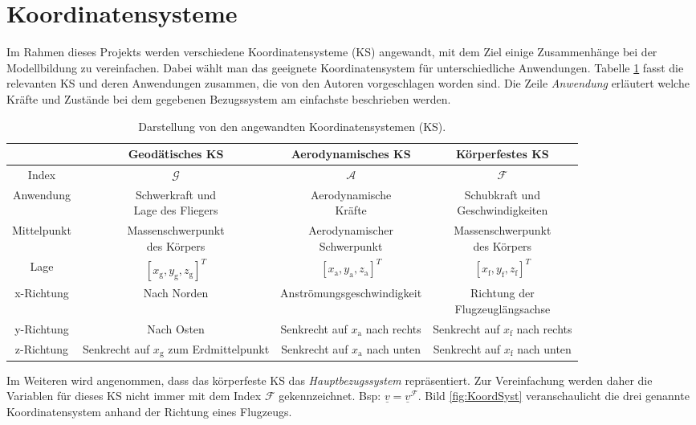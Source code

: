 \section{Koordinatensysteme}
Im Rahmen dieses Projekts werden verschiedene Koordinatensysteme (KS) angewandt, mit dem Ziel einige Zusammenhänge bei der Modellbildung zu vereinfachen. Dabei wählt man das geeignete Koordinatensystem für unterschiedliche Anwendungen. Tabelle \ref{tab:KoordSystem} fasst die relevanten KS und deren Anwendungen zusammen, die von den Autoren \cite{FlugmechanikBuch} vorgeschlagen worden sind. Die Zeile \textit{Anwendung} erläutert welche Kräfte und Zustände bei dem gegebenen Bezugssystem am einfachste beschrieben werden.
\begin{table}[h]
 \begin{tabular}{||c c c c ||} 
 \hline
 &Geodätisches KS  & Aerodynamisches KS & Körperfestes KS\\ [0.5ex] 
\hline
Index&$\mathcal{G}$  & $\mathcal{A}$ & $\mathcal{F}$\\
\hline
Anwendung&  \makecell{Schwerkraft und \\Lage des Fliegers} &  \makecell{Aerodynamische\\ Kräfte} &  \makecell{Schubkraft und \\Geschwindigkeiten} \\
\hline
Mittelpunkt& \makecell{Massenschwerpunkt\\ des Körpers} &  \makecell{Aerodynamischer \\Schwerpunkt} &  \makecell{Massenschwerpunkt\\ des Körpers}\\
\hline
Lage &$[x_\mathrm{g},y_\mathrm{g},z_\mathrm{g}]^T$  & $[x_\mathrm{a},y_\mathrm{a},z_\mathrm{a}]^T$ &$[x_\mathrm{f},y_\mathrm{f},z_\mathrm{f}]^T$\\
\hline
x-Richtung& Nach Norden    & Anströmungsgeschwindigkeit &  \makecell{Richtung der\\ Flugzeuglängsachse}\\
\hline
y-Richtung& Nach Osten  &  \makecell{Senkrecht auf $x_\mathrm{a}$\\ nach rechts}  &  \makecell{Senkrecht auf $x_\mathrm{f}$\\ nach rechts}\\
\hline
z-Richtung & \makecell{Senkrecht auf $x_\mathrm{g}$\\ zum Erdmittelpunkt}& \makecell{Senkrecht auf $x_\mathrm{a}$ \\nach unten}&  \makecell{Senkrecht auf $x_\mathrm{f}$\\ nach unten}\\ [1ex] 
 \hline
\end{tabular}
\caption{Darstellung von den angewandten Koordinatensystemen (KS).}
\label{tab:KoordSystem}
\end{table}
Im Weiteren wird angenommen, dass das körperfeste KS das \textit{Hauptbezugssystem} repräsentiert. Zur Vereinfachung werden daher die Variablen für dieses KS nicht immer mit dem Index $\mathcal{F}$ gekennzeichnet. Bsp: $\underline{v} = \underline{v}^\mathcal{F}.$ Bild \ref{fig:KoordSyst} veranschaulicht die drei genannte Koordinatensystem anhand der Richtung eines Flugzeugs.

